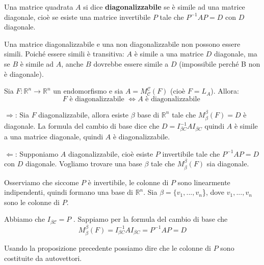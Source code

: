 \documentclass[
  a4paper,
]{article}
\begin{document}
\begin{definitionbox}
Una matrice quadrata \(A\) si dice \textbf{diagonalizzabile} se è simile
ad una matrice diagonale, cioè se esiste una matrice invertibile \(P\)
tale che \(P^{-1}AP = D\) con \(D\) diagonale.
\end{definitionbox}

\begin{observationbox}
Una matrice diagonalizzabile e una non diagonalizzabile non possono
essere simili. Poiché essere simili è transitiva: \(A\) è simile a una
matrice \(D\) diagonale, ma se \(B\) è simile ad \(A\), anche \(B\)
dovrebbe essere simile a \(D\) (impossibile perché B non è diagonale).
\end{observationbox}

\begin{propositionbox}
Sia \(F: \mathbb{R}^n \to \mathbb{R}^n\) un endomorfismo e sia
\(A = M^{{\mathcal{C}}}_{\mathcal{C}}(F)\) (cioè \(F = L_A\)). Allora:
\[
F \text{ è diagonalizzabile } \iff A \text{ è diagonalizzabile }
\]
\end{propositionbox}

\begin{proofbox}
\(\Rightarrow\): Sia \(F\) diagonalizzabile, allora esiste \(\beta\)
base di \(\mathbb{R}^n\) tale che \(M^{{\beta}}_{\beta}(F) = D\) è
diagonale. La formula del cambio di base dice che
\(D = I^{{-1}}_{\beta C}AI_{\beta C}\) quindi \(A\) è simile a una
matrice diagonale, quindi \(A\) è diagonalizzabile.

\(\Leftarrow\): Supponiamo \(A\) diagonalizzabile, cioè esiste \(P\)
invertibile tale che \(P^{-1}AP = D\) con \(D\) diagonale. Vogliamo
trovare una base \(\beta\) tale che \(M^{{\beta}}_{\beta}(F)\) sia
diagonale.

Osserviamo che siccome \(P\) è invertibile, le colonne di \(P\) sono
linearmente indipendenti, quindi formano una base di \(\mathbb{R}^n\).
Sia \(\beta = \{v_1, ..., v_n\)\}, dove \(v_1, ..., v_n\) sono le
colonne di \(P\).

Abbiamo che \(I_{\beta \mathcal{C}} = P\) . Sappiamo per la formula del
cambio di base che \[
M^{{\beta}}_{\beta}(F) = I^{{-1}}_{\beta C}AI_{\beta C} = P^{-1}AP = D
\]
\end{proofbox}

\begin{observationbox}
Usando la proposizione precedente possiamo dire che le colonne di \(P\)
sono costituite da autovettori.
\end{observationbox}
\end{document}
